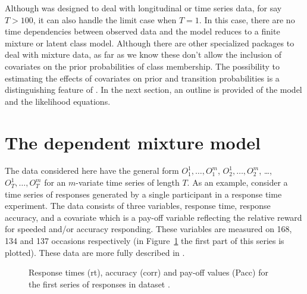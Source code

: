 \documentclass[article]{jss}
\begin{document}
Although  was designed to deal with longitudinal or time
series data, for say $T>100$, it can also handle the limit case when
$T=1$.  In this case, there are no time dependencies between
observed data and the model reduces to a finite mixture or
latent class model. Although there are other specialized packages to
deal with mixture data, as far as we know these 
don't allow the inclusion of covariates on the prior probabilities of
class membership. The possibility to estimating the effects of covariates on 
prior and transition probabilities is a distinguishing feature of 
. In the next section, an outline is provided of the model and 
the likelihood equations.


\section{The dependent mixture model}

The data considered here have the general form $O_{1}^{1}, \ldots,
O_{1}^{m}$, $O_{2}^{1}, \ldots, O_{2}^{m}$, \ldots, $O_{T}^{1},
\ldots, O_{T}^{m}$ for an $m$-variate time series of length $T$.  As
an example, consider a time series of responses generated by a single
participant in a response time experiment. The data consists of three
variables, response time, response accuracy, and a covariate which is a pay-off
variable reflecting the relative reward for speeded and/or accuracy responding. 
These variables are measured on 168, 134 and 137 occasions respectively (in
Figure~\ref{fig:speed} the first part of this series is plotted). These data
are more fully described in \citet{Dutilh2009}. 

\begin{figure}[htbp]
  \begin{center}
	  \caption{Response times (rt), accuracy (corr) and pay-off values (Pacc) for
	  the first series of responses in dataset .}
	  \label{fig:speed}
  \end{center}
\end{figure}
\end{document}
